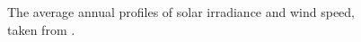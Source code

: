 	
\begin{figure}[h!]
	\centering
	
	\begin{minipage}{0.8\textwidth}
		\hfill
		
		\caption{The average annual profiles of solar irradiance and wind speed, taken from \cite{W11}.}\label{fig:overyear}
	\end{minipage}	
\end{figure}
